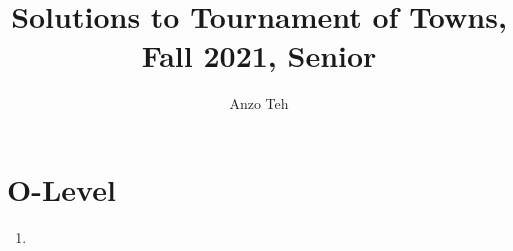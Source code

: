 \documentclass[11pt,a4paper]{article}
\begin{document}
\newcommand{\la}{\leftarrow}
\newcommand{\lra}{\leftrightarrow}
\newcommand{\bbN}{\mathbb{N}}
\newcommand{\bbZ}{\mathbb{Z}}
\newcommand{\dsum}{\displaystyle\sum}
\newcommand{\dprod}{\displaystyle\prod}


\title{Solutions to Tournament of Towns, Fall 2021, Senior}
\author{Anzo Teh}
\date{}
\maketitle

\section*{O-Level}
\begin{enumerate}
	\item
\end{enumerate}
\end{document}
